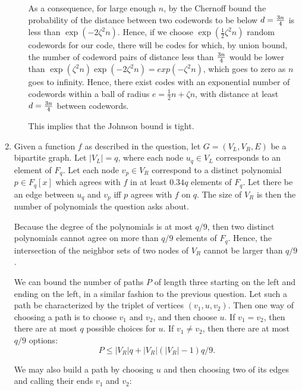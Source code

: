 \documentclass[11pt]{article} \usepackage{amssymb}
\newcommand{\half}{{\textstyle \frac12}}
\begin{document}
\begin{enumerate}
\begin{enumerate}
      As a consequence, for large enough $n$, 
      by the Chernoff bound the probability of the distance
      between two codewords to be below $d={3n\over 4}$ is 
      less than $\exp(-2\zeta^2n)$. Hence, if we choose $\exp(\half\zeta^2n)$ 
      random codewords
      for our code, there will be codes for which, by union bound, the number
      of codeword pairs of distance less than ${3n\over 4}$ would be lower
      than $\exp(\zeta^2n)\exp(-2\zeta^2n)=exp(-\zeta^2n)$, which goes to zero as $n$ goes
      to infinity. Hence, there exist codes with an exponential number
      of codewords within a ball of radius $e=\half n+\zeta n$, 
      with distance at least $d={3n\over 4}$ between codewords.

      This implies that the Johnson bound is tight.
    \end{enumerate}
  \item       

    Given a function $f$ as described in the question, let $G=(V_L,V_R,E)$ 
    be a bipartite graph. Let $|V_L|=q$, where
    each node $u_q\in V_L$ corresponds to an element of $F_q$. Let each node 
    $v_p\in V_R$ correspond to a distinct polynomial $p\in F_q[x]$ which agrees with
    $f$ in at least $0.34q$ elements of $F_q$. Let there be an edge between
    $u_q$ and $v_p$ iff $p$ agrees with $f$ on $q$. The size of $V_R$ is then
    the number of polynomials the question asks about.

    Because the degree of the polynomials is at most $q/9$, then
    two distinct polynomials cannot agree on more than $q/9$ elements   
    of $F_q$. Hence, the intersection of the neighbor sets of two 
    nodes of $V_R$ cannot be larger than $q/9$. 

    We can bound the number of paths $P$ of length three starting on the
    left and ending on the left, in a similar fashion to the previous 
    question. Let such a path be characterized by the triplet
    of vertices $(v_1,u,v_2)$. Then one way of choosing a path is
    to choose $v_1$ and $v_2$, and then choose $u$. If $v_1=v_2$, then
    there are at most $q$ possible choices for $u$. If $v_1\neq v_2$, then
    there are at most $q/9$ options:
    \begin{equation*}
      P\leq |V_R|q+|V_R|(|V_R|-1)q/9.
    \end{equation*}
    
    We may also build a path by choosing $u$ and then choosing two of
    its edges and calling their ends $v_1$ and $v_2$:


\end{enumerate}
\end{document}
